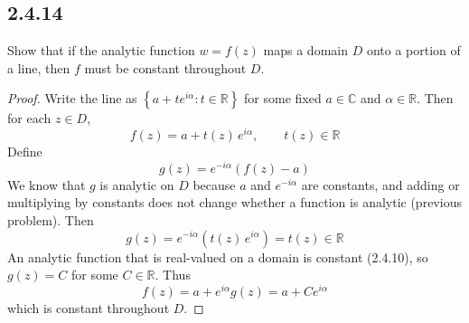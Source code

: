 \documentclass{article}
\begin{document}
\subsection*{2.4.14}
Show that if the analytic function $w = f(z)$ maps a domain $D$ onto a portion
of a line, then $f$ must be constant throughout $D$.
\begin{proof}
  Write the line as $\left\{a + te^{i\alpha} : t \in \mathbb{R}\right\}$ for some
  fixed $a \in \mathbb{C}$ and $\alpha \in \mathbb{R}$. Then for each $z \in D$,
  \[
    f(z) = a + t(z)\,e^{i\alpha}, \qquad t(z) \in \mathbb{R}
  \]
  Define
  \[
    g(z) = e^{-i\alpha}\left(f(z) - a\right)
  \]
  We know that $g$ is analytic on $D$ because $a$ and $e^{-i\alpha}$ are constants,
  and adding or multiplying by constants does not change whether a function is
  analytic (previous problem). Then
  \[
    g(z) = e^{-i\alpha}\left(t(z)\,e^{i\alpha}\right) = t(z) \in \mathbb{R}
  \]
  An analytic function that is real-valued on a domain is constant (2.4.10), so
  $g(z) = C$ for some $C \in \mathbb{R}$. Thus
  \[
    f(z) = a + e^{i\alpha} g(z) = a + Ce^{i\alpha}
  \]
  which is constant throughout $D$.
\end{proof}
\end{document}

